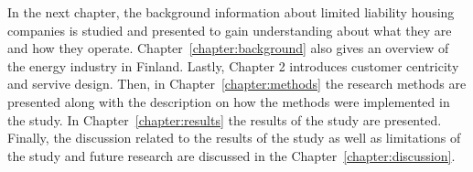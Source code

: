 In the next chapter, the background information about limited liability housing companies is studied and presented to gain understanding about what they are and how they operate. Chapter~\ref{chapter:background} also gives an overview of the energy industry in Finland. Lastly, Chapter 2 introduces customer centricity and servive design. Then, in Chapter~\ref{chapter:methods} the research methods are presented along with the description on how the methods were implemented in the study. In Chapter~\ref{chapter:results} the results of the study are presented. Finally, the discussion related to the results of the study as well as limitations of the study and future research are discussed in the Chapter~\ref{chapter:discussion}.